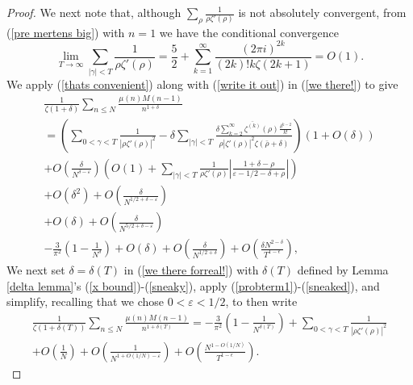 \documentclass[11pt,article]{amsart}
\numberwithin{equation}{section}
\numberwithin{equation}{section}
\numberwithin{lemma}{section}
\numberwithin{prop}{section}
\begin{document}
\begin{proof}
We next note that, although $\sum_{\rho}\frac{1}{\rho\zeta'(\rho)}$ is not absolutely convergent, from (\ref{pre mertens big}) with $n=1$ we have the conditional convergence
\begin{equation}
\lim_{T\rightarrow \infty}\sum_{\left|\gamma\right|<T}\frac{1}{\rho\zeta'(\rho)}=\frac{5}{2}+\sum_{k=1}^{\infty}\frac{(2\pi i)^{2k}}{(2k)!k\zeta(2k+1)}=O(1). \label{thats convenient}
\end{equation}
We apply (\ref{thats convenient}) along with (\ref{write it out}) in (\ref{we there!}) to give
\begin{align}
\frac{1}{\zeta(1+\delta)}\sum_{n\leq N}\frac{\mu(n)M(n-1)}{n^{1+\delta}}\nonumber \\=\left(\sum_{0<\gamma<T}\frac{1}{\left|\rho \zeta'(\rho)\right|^{2}}-\delta\sum_{\left|\gamma\right|<T}\frac{\delta\sum_{k=2}^{\infty}\overline{\zeta^{(k)}}(\rho)\frac{\delta^{k-2}}{k!}}{\rho \left|\zeta'(\rho)\right|^{2}\zeta\left(\bar{\rho}+\delta\right)}\right)\left(1+O(\delta)\right)\nonumber \\ +O\left(\frac{\delta}{N^{\delta-\varepsilon}}\right)\left(O(1)+\sum_{\left|\gamma\right|<T}\frac{1}{\rho\zeta'(\rho)}\left|\frac{1+\delta-\rho}{\varepsilon-1/2-\delta+\rho}\right|\right) \nonumber \\ +O\left(\delta^{2}\right)+O\left(\frac{\delta}{N^{1/2+\delta-\varepsilon}}\right) \nonumber \\ +O\left(\delta\right)+O\left(\frac{\delta}{N^{5/2+\delta-\varepsilon}}\right)  \nonumber \\
-\frac{3}{\pi^{2}}\left(1-\frac{1}{N^{\delta}}\right)+O\left(\delta\right)+O\left(\frac{\delta}{N^{1/2+\delta}}\right)+O\left(\frac{\delta N^{2-\delta}}{T^{1-\epsilon}}\right),\label{we there forreal!}
\end{align}
We next set $\delta=\delta(T)$ in (\ref{we there forreal!}) with $\delta(T)$ defined by Lemma \ref{delta lemma}'s (\ref{x bound})-(\ref{sneaky}), apply (\ref{probterm1})-(\ref{sneaked}), and simplify, recalling that we chose $0<\varepsilon<1/2$, to then write
\begin{align}
\frac{1}{\zeta\left(1+\delta(T)\right)}\sum_{n\leq N}\frac{\mu(n)M(n-1)}{n^{1+\delta(T)}}=-\frac{3}{\pi^{2}}\left(1-\frac{1}{N^{\delta(T)}}\right)+\sum_{0<\gamma<T}\frac{1}{\left|\rho \zeta'(\rho)\right|^{2}} \nonumber \\ +O\left(\frac{1}{N}\right)+O\left(\frac{1}{N^{1+O(1/N)-\varepsilon}}\right)+O\left(\frac{N^{1-O(1/N)}}{T^{1-\epsilon}}\right). \label{we really there!}
\end{align}

\end{proof}
\end{document}

